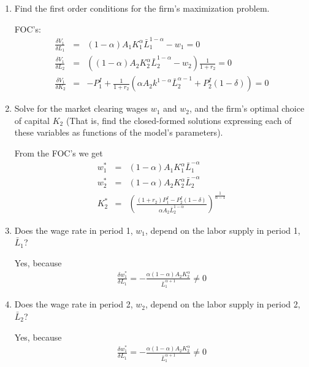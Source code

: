 \documentclass[11pt]{SelfArxOneColBMN}
\begin{document}
\begin{enumerate}
  \item Find the first order conditions for the firm's maximization problem.
  \begin{solution}
    FOC's:
    \begin{eqnarray*}
      \frac{\delta V_1}{\delta L_1} &=& (1 - \alpha)A_1K_1^\alpha \bar{L}_1^{1 - \alpha} - w_1 = 0\\
      \frac{\delta V_1}{\delta L_2} &=& ((1 - \alpha)A_2K_2^\alpha \bar{L}_2^{1 - \alpha} - w_2)\frac{1}{1 + r_2} = 0\\
      \frac{\delta V_1}{\delta K_2} &=& -P_1^I + \frac{1}{1 + r_2}(\alpha A_2k^{1 - \alpha}\bar{L}_2^{\alpha - 1} + P_2^I(1 - \delta)) = 0
    \end{eqnarray*}
  \end{solution}
  \item Solve for the market clearing wages $w_1$ and $w_2$, and the firm's optimal choice of capital $K_2$ (That is, find the closed-formed solutions expressing each of these variables as functions of the model's parameters).
  \begin{solution}
    From the FOC's we get
    \begin{eqnarray*}
      w_1^* &=& (1 - \alpha)A_1K_1^{\alpha}\bar{L}_1^{- \alpha}\\
      w_2^* &=& (1 - \alpha)A_2K_2^{\alpha}\bar{L}_2^{- \alpha}\\
      K_2^* &=& (\frac{(1 + r_2)P_1^I - P_2^I(1 - \delta)}{\alpha A_2\bar{L}_2^{1 - \alpha}})^\frac{1}{\alpha - 1}
    \end{eqnarray*}
  \end{solution}
  \item Does the wage rate in period 1, $w_1$, depend on the labor supply in period 1, $\bar{L}_1$?
  \begin{solution}
    Yes, because
    \begin{eqnarray*}
      \frac{\delta w_1^*}{\delta L_1} = -\frac{\alpha(1 - \alpha)A_2K_2^\alpha}{\bar{L}_1^{\alpha + 1}} \neq 0
    \end{eqnarray*}
  \end{solution}
  \item Does the wage rate in period 2, $w_2$, depend on the labor supply in period 2, $\bar{L}_2$?
  \begin{solution}
    Yes, because
    \begin{eqnarray*}
      \frac{\delta w_1^*}{\delta L_1} = -\frac{\alpha(1 - \alpha)A_2K_2^\alpha}{\bar{L}_1^{\alpha + 1}} \neq 0

\end{eqnarray*}
\end{solution}
\end{enumerate}
\end{document}
